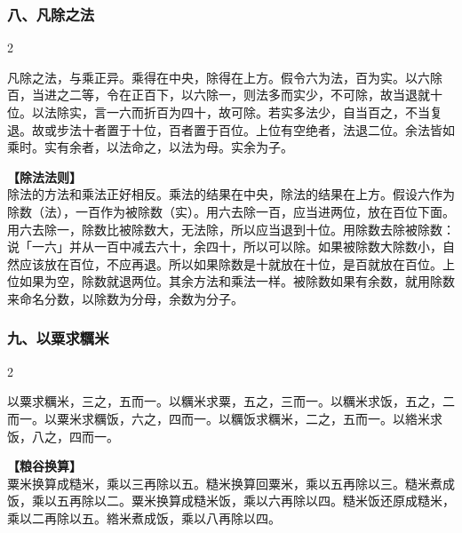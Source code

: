 \documentclass[11pt,a4paper]{article}
\begin{document}
\vspace{0.3cm}

\subsubsection*{八、凡除之法}
\begin{paracol}{2}
\begin{problemclassical}
凡除之法，与乘正异。乘得在中央，除得在上方。假令六为法，百为实。以六除百，当进之二等，令在正百下，以六除一，则法多而实少，不可除，故当退就十位。以法除实，言一六而折百为四十，故可除。若实多法少，自当百之，不当复退。故或步法十者置于十位，百者置于百位。上位有空绝者，法退二位。余法皆如乘时。实有余者，以法命之，以法为母。实余为子。
\end{problemclassical}
\switchcolumn
\begin{problemmodern}
\textbf{【除法法则】}\\
除法的方法和乘法正好相反。乘法的结果在中央，除法的结果在上方。假设六作为除数（法），一百作为被除数（实）。用六去除一百，应当进两位，放在百位下面。用六去除一，除数比被除数大，无法除，所以应当退到十位。用除数去除被除数：说「一六」并从一百中减去六十，余四十，所以可以除。如果被除数大除数小，自然应该放在百位，不应再退。所以如果除数是十就放在十位，是百就放在百位。上位如果为空，除数就退两位。其余方法和乘法一样。被除数如果有余数，就用除数来命名分数，以除数为分母，余数为分子。
\end{problemmodern}
\end{paracol}

\newpage

\subsubsection*{九、以粟求糲米}
\begin{paracol}{2}
\begin{problemclassical}
以粟求糲米，三之，五而一。以糲米求粟，五之，三而一。以糲米求饭，五之，二而一。以粟米求糲饭，六之，四而一。以糲饭求糲米，二之，五而一。以綹米求饭，八之，四而一。
\end{problemclassical}
\switchcolumn
\begin{problemmodern}
\textbf{【粮谷换算】}\\
粟米换算成糙米，乘以三再除以五。糙米换算回粟米，乘以五再除以三。糙米煮成饭，乘以五再除以二。粟米换算成糙米饭，乘以六再除以四。糙米饭还原成糙米，乘以二再除以五。綹米煮成饭，乘以八再除以四。
\end{problemmodern}
\end{paracol}
\end{document}
